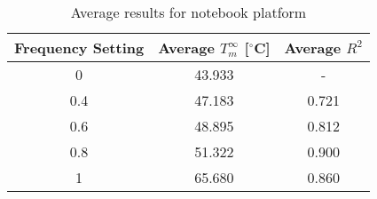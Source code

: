 \begin{table}[H]
 \centering
 \caption[Thermal Profile Notebook]{Average results for notebook platform}\label{tab:t_tp_n}
 \begin{tabular}{||c | c | c||} 
 \hline
 Frequency Setting & Average $T^\infty_m$ [$^{\circ}$C] & Average $R^2$ \\ [0.5ex] 
 \hline\hline
 0 & 43.933 & - \\
 \hline
 0.4 & 47.183 & 0.721 \\
 \hline
 0.6 & 48.895 & 0.812 \\
 \hline
 0.8 & 51.322 & 0.900 \\
 \hline
 1 & 65.680 & 0.860 \\
 \hline
\end{tabular}
\end{table}